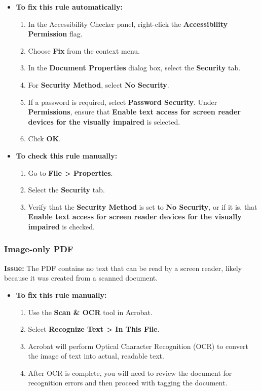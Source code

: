 \begin{itemize}
	\item \textbf{To fix this rule automatically:}
	      \begin{enumerate}
		      \item In the Accessibility Checker panel, right-click the \textbf{Accessibility Permission} flag.
		      \item Choose \textbf{Fix} from the context menu.
		      \item In the \textbf{Document Properties} dialog box, select the \textbf{Security} tab.
		      \item For \textbf{Security Method}, select \textbf{No Security}.
		      \item If a password is required, select \textbf{Password Security}. Under \textbf{Permissions}, ensure that \textbf{Enable text access for screen reader devices for the visually impaired} is selected.
		      \item Click \textbf{OK}.
	      \end{enumerate}
	\item \textbf{To check this rule manually:}
	      \begin{enumerate}
		      \item Go to \textbf{File > Properties}.
		      \item Select the \textbf{Security} tab.
		      \item Verify that the \textbf{Security Method} is set to \textbf{No Security}, or if it is, that \textbf{Enable text access for screen reader devices for the visually impaired} is checked.
	      \end{enumerate}
\end{itemize}

\subsubsection{Image-only PDF}
\label{ssubsec:pdf-image-only}

\textbf{Issue:} The PDF contains no text that can be read by a screen reader, likely because it was created from a scanned document.

\begin{itemize}
	\item \textbf{To fix this rule manually:}
	      \begin{enumerate}
		      \item Use the \textbf{Scan \& OCR} tool in Acrobat.
		      \item Select \textbf{Recognize Text > In This File}.
		      \item Acrobat will perform Optical Character Recognition (OCR) to convert the image of text into actual, readable text.
		      \item After \gls{OCR} is complete, you will need to review the document for recognition errors and then proceed with tagging the document.
	      \end{enumerate}
\end{itemize}

